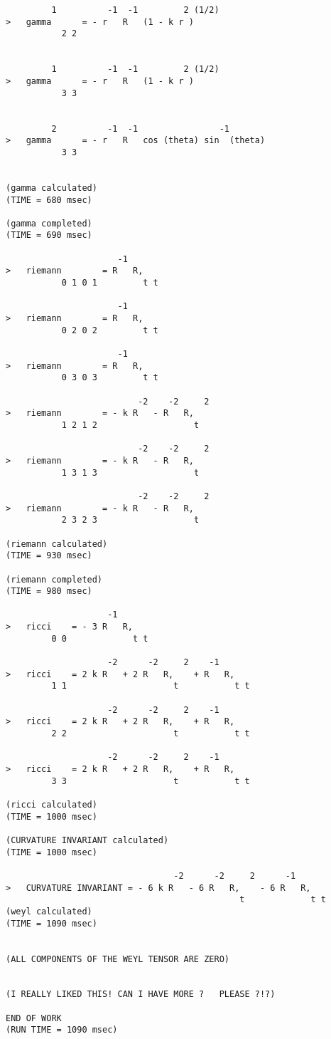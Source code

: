 \begin{verbatim}
         1          -1  -1         2 (1/2)
>   gamma      = - r   R   (1 - k r )
           2 2


         1          -1  -1         2 (1/2)
>   gamma      = - r   R   (1 - k r )
           3 3


         2          -1  -1                -1
>   gamma      = - r   R   cos (theta) sin  (theta)
           3 3


(gamma calculated)
(TIME = 680 msec)

(gamma completed)
(TIME = 690 msec)

                      -1
>   riemann        = R   R,
           0 1 0 1         t t

                      -1
>   riemann        = R   R,
           0 2 0 2         t t

                      -1
>   riemann        = R   R,
           0 3 0 3         t t

                          -2    -2     2
>   riemann        = - k R   - R   R,
           1 2 1 2                   t

                          -2    -2     2
>   riemann        = - k R   - R   R,
           1 3 1 3                   t

                          -2    -2     2
>   riemann        = - k R   - R   R,
           2 3 2 3                   t

(riemann calculated)
(TIME = 930 msec)

(riemann completed)
(TIME = 980 msec)

                    -1
>   ricci    = - 3 R   R,
         0 0             t t

                    -2      -2     2    -1
>   ricci    = 2 k R   + 2 R   R,    + R   R,
         1 1                     t           t t

                    -2      -2     2    -1
>   ricci    = 2 k R   + 2 R   R,    + R   R,
         2 2                     t           t t

                    -2      -2     2    -1
>   ricci    = 2 k R   + 2 R   R,    + R   R,
         3 3                     t           t t

(ricci calculated)
(TIME = 1000 msec)

(CURVATURE INVARIANT calculated)
(TIME = 1000 msec)

                                 -2      -2     2      -1
>   CURVATURE INVARIANT = - 6 k R   - 6 R   R,    - 6 R   R,
                                              t             t t
(weyl calculated)
(TIME = 1090 msec)


(ALL COMPONENTS OF THE WEYL TENSOR ARE ZERO)


(I REALLY LIKED THIS! CAN I HAVE MORE ?   PLEASE ?!?)

END OF WORK
(RUN TIME = 1090 msec)
\end{verbatim}

